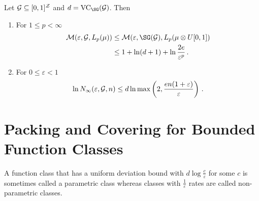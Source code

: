 \documentclass[twoside]{article}
\newcommand{\VC}{\mathrm{VC}}
\begin{document}
\begin{theorem}
    Let $\mathcal{G} \subseteq [0,1]^{\mathcal{Z}}$ and $d = \VC_\SG(\cG)$. Then
    \begin{enumerate}
        \item For $1 \le p < \infty$
        \begin{align*}
            \cM(\varepsilon, \cG, L_p(\mu)) &\le \cM(\varepsilon, \SG(\cG), L_p(\mu \otimes U[0,1]) \\
            &\le 1 + \ln(d+1) + \ln\frac{2e}{\varepsilon^p}  \,.
        \end{align*}
        \item For $0 \le \varepsilon < 1$
        \begin{align*}
            \ln N_\infty(\varepsilon, \mathcal{G}, n) \le d \ln \max \left( 2, \frac{en(1+\varepsilon)}{\varepsilon} \right) \,.
        \end{align*}
    \end{enumerate}
\end{theorem}


\section{Packing and Covering for Bounded Function Classes}
A function class that has a uniform deviation bound with $d\log\frac{c}{\varepsilon}$ for some $c$ is sometimes called a parametric class whereas classes with $\frac1\varepsilon$ rates are called non-parametric classes.
 
\end{document}
